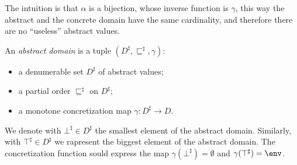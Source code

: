 The intuition is that \(\alpha\) is a bijection, whose inverse
function is \(\gamma\), this way the abstract and the concrete domain
have the same cardinality, and therefore there are no ``useless''
abstract values.

\begin{definition}
  An \emph{abstract domain} is a tuple \((D^\sharp ,
  \sqsubseteq^\sharp, \gamma)\):
  \begin{itemize}
  \item a denumerable set \(D^\sharp\) of abstract values;
  \item a partial order \(\sqsubseteq^\sharp\) on \(D^\sharp\);
  \item a monotone concretization map \(\gamma : D^\sharp \to D\).
  \end{itemize}
  We denote with \(\bot^\sharp \in D^\sharp\) the smallest element of
  the abstract domain. Similarly, with \(\top^\sharp \in D^\sharp\) we
  rapresent the biggest element of the abstract domain. The
  concretization function sould express the map \(\gamma(\bot^\sharp)
  = \emptyset\) and \(\gamma(\top^\sharp) = \env\).
\end{definition}
